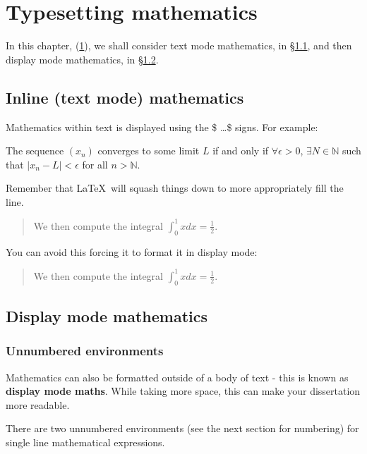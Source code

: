 \documentclass[a4paper,oneside]{book}
\begin{document}
\chapter{Typesetting mathematics}
\label{chap_typesetting}

In this chapter, (\ref{chap_typesetting}), we shall consider text mode mathematics,  in \S\ref{sec_text_mode_maths}, and then display mode mathematics, in \S\ref{sec_display_mode_maths}.


\section{Inline (text mode) mathematics}
\label{sec_text_mode_maths}

Mathematics within text is displayed using the \$ \ldots \$ signs.  For example:

\begin{definition}
The sequence $(x_n)$ converges to some limit $L$ if and only if $\forall \epsilon > 0$, $\exists N \in \mathbb{N}$ such that $|x_n - L| < \epsilon$ for all $n > \mathbb{N}$.
\end{definition}

Remember that \LaTeX\, will squash things down to more appropriately fill the line.
\begin{quote}
We then compute the integral $\int_0^1 x dx = \frac{1}{2}$.
\end{quote}
You can avoid this forcing it to format it in display mode:
\begin{quote}
We then compute the integral $\displaystyle{ \int_0^1 x dx = \frac{1}{2} }$.
\end{quote}


\section{Display mode mathematics}
\label{sec_display_mode_maths}


\subsection{Unnumbered environments}

Mathematics can also be formatted outside of a body of text - this is known as \textbf{display mode maths}.
While taking more space, this can make your dissertation more readable.

There are two unnumbered environments (see the next section for numbering) for single line mathematical expressions.
\end{document}
